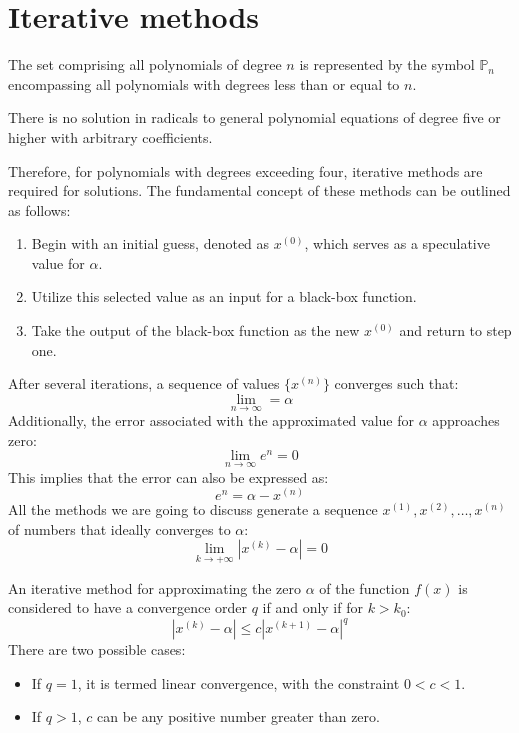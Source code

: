 \documentclass[12pt, a4paper]{report}
\begin{document}
    \section{Iterative methods}
    The set comprising all polynomials of degree $n$ is represented by the symbol $\mathbb{P}_n$ encompassing all polynomials with degrees less than or equal to $n$.
    \begin{theorem}
        There is no solution in radicals to general polynomial equations of degree five or higher with arbitrary coefficients. 
    \end{theorem}
    Therefore, for polynomials with degrees exceeding four, iterative methods are required for solutions. 
    The fundamental concept of these methods can be outlined as follows:
    \begin{enumerate}
        \item Begin with an initial guess, denoted as $x^{(0)}$, which serves as a speculative value for $\alpha$.
        \item Utilize this selected value as an input for a black-box function.
        \item Take the output of the black-box function as the new $x^{(0)}$ and return to step one. 
    \end{enumerate}
    After several iterations, a sequence of values $\{ x^{(n)} \}$ converges such that:
    \[ \lim_{n \rightarrow \infty} = \alpha\]
    Additionally, the error associated with the approximated value for $\alpha$ approaches zero:
    \[ \lim_{n \rightarrow \infty}e^n = 0\]
    This implies that the error can also be expressed as: 
    \[e^n=\alpha-x^{(n)}\]
    All the methods we are going to discuss generate a sequence $x^{(1)},x^{(2)},\dots,x^{(n)}$ of numbers that ideally converges to $\alpha$:
    \[ \lim_{k \rightarrow + \infty} \left\lvert x^{(k)}-\alpha \right\rvert =0\]
    \begin{definition}
        An iterative method for approximating the zero $\alpha$ of the function $f(x)$ is considered to have a convergence order $q$ if and only if for $k > k_0$:
        \[\left\lvert x^{(k)} - \alpha \right\rvert \leq c {\left\lvert x^{(k+1)} - \alpha \right\rvert}^q  \]
        There are two possible cases:
        \begin{itemize}
            \item If $q=1$, it is termed linear convergence, with the constraint $0<c<1$.
            \item If $q>1$, $c$ can be any positive number greater than zero.
        \end{itemize}
    \end{definition}
\end{document}

